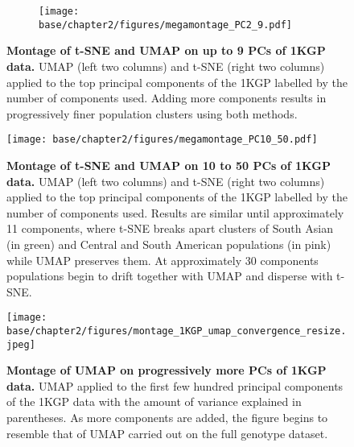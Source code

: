\begin{figure}[!ht]
    \centering
    \begin{subfigure}{\textwidth}
    \texttt{[image: base/chapter2/figures/megamontage\_PC2\_9.pdf]}
    \end{subfigure}
    \caption[Montage of t-SNE and UMAP on up to 9 PCs of 1KGP data]{\textbf{Montage of t-SNE and UMAP on up to 9 PCs of 1KGP data.} UMAP (left two columns) and t-SNE (right two columns) applied to the top principal components of the 1KGP labelled by the number of components used. Adding more components results in progressively finer population clusters using both methods.}
    \label{fig:supp_megamontage_pc2_9}  
\end{figure}

\newpage

\begin{figure}[ht]
    \centering
    \texttt{[image: base/chapter2/figures/megamontage\_PC10\_50.pdf]}
    \caption[Montage of t-SNE and UMAP on 10 to 50 PCs of 1KGP data]{\textbf{Montage of t-SNE and UMAP on 10 to 50 PCs of 1KGP data.} UMAP (left two columns) and t-SNE (right two columns) applied to the top principal components of the 1KGP labelled by the number of components used. Results are similar until approximately 11 components, where t-SNE breaks apart clusters of South Asian (in green) and Central and South American populations (in pink) while UMAP preserves them. At approximately 30 components populations begin to drift together with UMAP and disperse with t-SNE.}
    \label{fig:supp_megamontage_pc10_50}
\end{figure}

\newpage

\begin{figure}[ht]
    \centering
    \texttt{[image: base/chapter2/figures/montage\_1KGP\_umap\_convergence\_resize.jpeg]}
    \caption[Montage of UMAP on progressively more PCs of 1KGP data]{\textbf{Montage of UMAP on progressively more PCs of 1KGP data.} UMAP applied to the first few hundred principal components of the 1KGP data with the amount of variance explained in parentheses. As more components are added, the figure begins to resemble that of UMAP carried out on the full genotype dataset.}
    \label{fig:supp_montage_1kgp_converge}
\end{figure}

